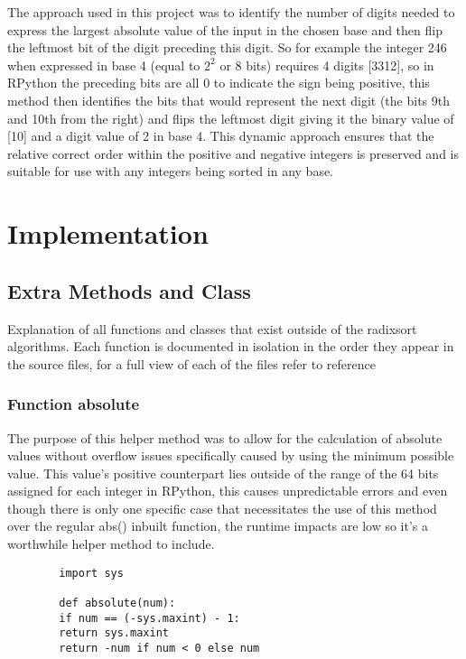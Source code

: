 \documentclass[12pt]{article}
\begin{document}
	\par
	The approach used in this project was to identify the number of digits needed to express the largest absolute value of the input in the chosen base and then flip the leftmost bit of the digit preceding this digit. So for example the integer 246 when expressed in base 4  (equal to $2^{2}$ or 8 bits) requires 4 digits [3312], so in RPython the preceding bits are all 0 to indicate the sign being positive, this method then identifies the bits that would represent the next digit (the bits 9th and 10th from the right) and flips the leftmost digit giving it the binary value of [10] and a digit value of 2 in base 4. This dynamic approach ensures that the relative correct order within the positive and negative integers is preserved  and is suitable for use with any integers being sorted in any base.
\pagebreak
\section{Implementation}
\subsection{Extra Methods and Class}
Explanation of all functions and classes that exist outside of the  radixsort algorithms. Each function is documented in isolation in the order they appear in the source files, for a full view of each of the files refer to {\color{red}reference}
\subsubsection{Function absolute}
The purpose of this helper method was to allow for the calculation of absolute values without overflow issues specifically caused by using the minimum possible value. This value's positive counterpart lies outside of the range of the 64 bits assigned for each integer in RPython, this causes unpredictable errors and even though there is only one specific case that necessitates the use of this method over the regular abs() inbuilt function, the runtime impacts are low so it's a worthwhile helper method to include.
\begin{lstlisting}
        import sys
        
        def absolute(num):
        if num == (-sys.maxint) - 1:
        return sys.maxint
        return -num if num < 0 else num
\end{lstlisting}
\end{document}
